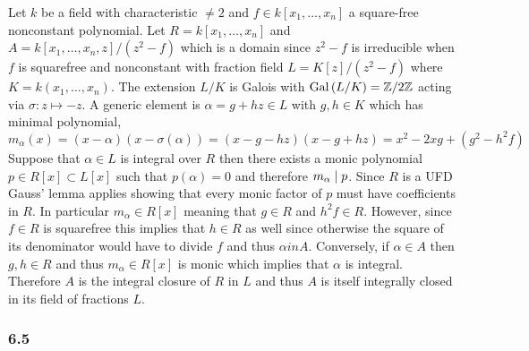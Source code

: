 \documentclass[12pt]{article}
\begin{document}
Let $k$ be a field with characteristic $\neq 2$ and $f \in k[x_1, \dots, x_n]$ a square-free nonconstant polynomial. Let $R = k[x_1, \dots, x_n]$ and $A = k[x_1, \dots, x_n, z]/(z^2 - f)$ which is a domain since $z^2 - f$ is irreducible when $f$ is squarefree and nonconstant with fraction field $L = K[z]/(z^2 - f)$ where $K = k(x_1, \dots, x_n)$. The extension $L / K$ is Galois with $\mathrm{Gal}\left( L/K \right) = \mathbb{Z} / 2 \mathbb{Z}$ acting via $\sigma : z \mapsto -z$. A generic element is $\alpha = g + h z \in L$ with $g,h \in K$ which has minimal polynomial,
\[ m_\alpha(x) = (x - \alpha)(x - \sigma(\alpha)) = (x - g - h z)(x - g + hz) = x^2 - 2 xg + (g^2 - h^2 f) \]
Suppose that $\alpha \in L$ is integral over $R$ then there exists a monic polynomial $p \in R[x] \subset L[x]$ such that $p(\alpha) = 0$ and therefore $m_\alpha \mid p$. Since $R$ is a UFD Gauss' lemma applies showing that every monic factor of $p$ must have coefficients in $R$. In particular $m_\alpha \in R[x]$ meaning that $g \in R$ and $h^2 f \in R$. However, since $f \in R$ is squarefree this implies that $h \in R$ as well since otherwise the square of its denominator would have to divide $f$ and thus $\alpha in A$. Conversely, if $\alpha \in A$ then $g,h \in R$ and thus $m_\alpha \in R[x]$ is monic which implies that $\alpha$ is integral. Therefore $A$ is the integral closure of $R$ in $L$ and thus $A$ is itself integrally closed in its field of fractions $L$.

\subsubsection{6.5}
\end{document}
